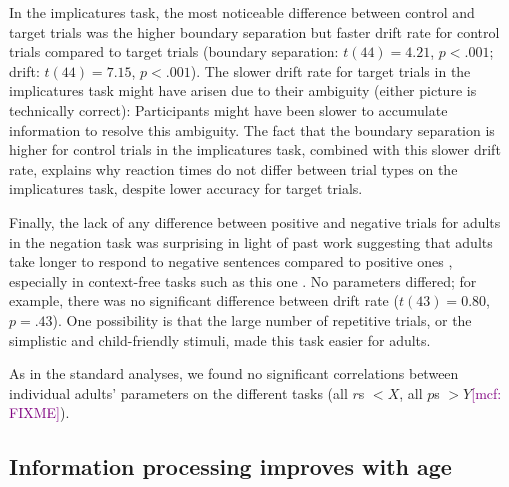 \documentclass[10pt,letterpaper]{article}
\newcommand{\mcf}[1]{\textcolor{Purple}{[mcf: #1]}}
\begin{document}
In the implicatures task, the most noticeable difference between control and target trials was the higher boundary separation but faster drift rate for control trials compared to target trials (boundary separation: $t(44) = 4.21$, $p< .001$; drift: $t(44) = 7.15$, $p< .001$). The slower drift rate for target trials in the implicatures task might have arisen due to their ambiguity (either picture is technically correct): Participants might have been slower to accumulate information to resolve this ambiguity. The fact that the boundary separation is higher for control trials in the implicatures task, combined with this slower drift rate, explains why reaction times do not differ between trial types on the implicatures task, despite lower accuracy for target trials.

Finally, the lack of any difference between positive and negative trials for adults in the negation task was surprising in light of past work suggesting that adults take longer to respond to negative sentences compared to positive ones \cite{hclark1972}, especially in context-free tasks such as this one \cite{nordmeyer2014a}. No parameters differed; for example, there was no significant difference between drift rate ($t(43) = 0.80$, $p = .43$). One possibility is that the large number of repetitive trials, or the simplistic and child-friendly stimuli, made this task easier for adults.

As in the standard analyses, we found no significant correlations between individual adults' parameters on the different tasks (all $r$s $< X$, all $p$s $> Y$\mcf{FIXME}).




\subsection{Information processing improves with age}

\end{document}
